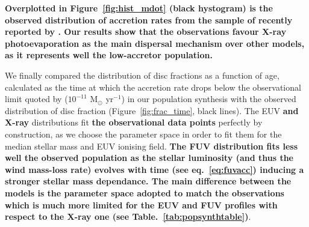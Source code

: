 \documentclass[fleqn,usenatbib]{mnras}
\begin{document}
{\bf Overplotted in Figure~\ref{fig:hist_mdot} (black hystogram) is the observed distribution of accretion rates from the sample of \citet{Manara2023} recently reported by \citet{Alexander2023}. Our results show that the observations favour X-ray photoevaporation as the main dispersal mechanism over other models, as it represents well the low-accretor population.}

We finally compared the distribution of disc fractions as a function of age, calculated as the time at which the accretion rate drops below the observational limit quoted by  ($10^{-11}$ M$_\odot$ yr$^{-1}$) in our population synthesis with the observed distribution of disc fraction (Figure~\ref{fig:frac_time}, black lines). The EUV \textbf{and X-ray} distributions fit \textbf{the observational data points} perfectly by construction, as we choose the parameter space in order to fit them for the median stellar mass and EUV ionising field. \textbf{The FUV distribution fits less well the observed population as the stellar luminosity (and thus the wind mass-loss rate) evolves with time (see eq.~\ref{eq:fuvacc}) inducing a stronger stellar mass dependance. The main difference between the models is the parameter space adopted to match the observations which is much more limited for the EUV and FUV profiles with respect to the X-ray one (see Table.~\ref{tab:popsynthtable})}.
\end{document}
